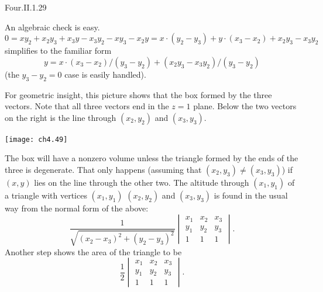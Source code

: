 \begin{ans}{Four.II.1.29}
      \begin{exparts}
        \partsitem An algebraic check is easy.
        \begin{equation*}
          0
          =xy_2+x_2y_3+x_3y-x_3y_2-xy_3-x_2y
          =x\cdot (y_2-y_3)+y\cdot (x_3-x_2)+x_2y_3-x_3y_2
        \end{equation*}
        simplifies to the familiar form
        \begin{equation*}
          y=x\cdot (x_3-x_2)/(y_3-y_2)+(x_2y_3-x_3y_2)/(y_3-y_2)
        \end{equation*}
        (the $y_3-y_2=0$ case is easily handled).

        For geometric insight, this
        picture shows that the box formed by the three vectors.
        Note that all
        three vectors end in the $z=1$ plane.
        Below the two vectors on the right is the line through
        $(x_2,y_2)$ and $(x_3,y_3)$.
        \begin{center}
          \texttt{[image: ch4.49]}
        \end{center}
        The box will
        have a nonzero volume unless the triangle formed by the ends of the
        three is degenerate.
        That only happens (assuming that $(x_2,y_3)\neq (x_3,y_3)$)
        if  $(x,y)$ lies on the line through the other two.
       \partsitem \answerasgiven %
        The altitude through $(x_1,y_1)$ of a triangle with vertices
        $(x_1,y_1)$ $(x_2,y_2)$ and $(x_3,y_3)$ is found in the usual
        way from the normal form of the above:
        \begin{equation*}
          \frac{1}{\sqrt{(x_2-x_3)^2+(y_2-y_3)^2}}
          \begin{vmatrix}
            x_1  &x_2  &x_3  \\
            y_1  &y_2  &y_3  \\
            1    &1    &1
          \end{vmatrix}.
        \end{equation*}
        Another step shows the area of the triangle to be
        \begin{equation*}
          \frac{1}{2}
          \begin{vmatrix}
            x_1  &x_2  &x_3  \\
            y_1  &y_2  &y_3  \\
            1    &1    &1
          \end{vmatrix}.
        \end{equation*}

\end{exparts}
\end{ans}
